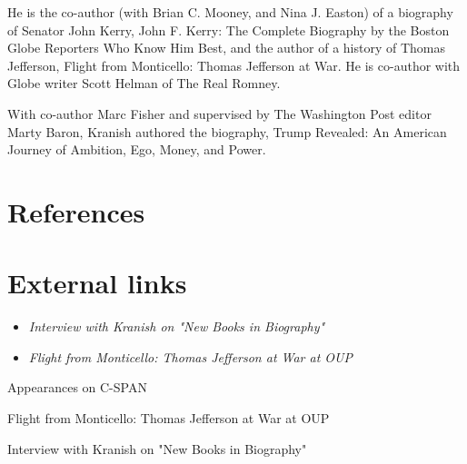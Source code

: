 He is the co-author (with Brian C. Mooney, and Nina J. Easton) of a
biography of Senator John Kerry, John F. Kerry: The Complete Biography
by the Boston Globe Reporters Who Know Him Best, and the author of a
history of Thomas Jefferson, Flight from Monticello: Thomas Jefferson at
War. He is co-author with Globe writer Scott Helman of The Real Romney.

With co-author Marc Fisher and supervised by The Washington Post editor
Marty Baron, Kranish authored the biography, Trump Revealed: An American
Journey of Ambition, Ego, Money, and Power.

\section{References}\label{references}

\section{External links}\label{external-links}

\begin{itemize}
\item
  \emph{Interview with Kranish on "New Books in Biography"}
\item
  \emph{Flight from Monticello: Thomas Jefferson at War at OUP}
\end{itemize}

Appearances on C-SPAN

Flight from Monticello: Thomas Jefferson at War at OUP

Interview with Kranish on "New Books in Biography"
